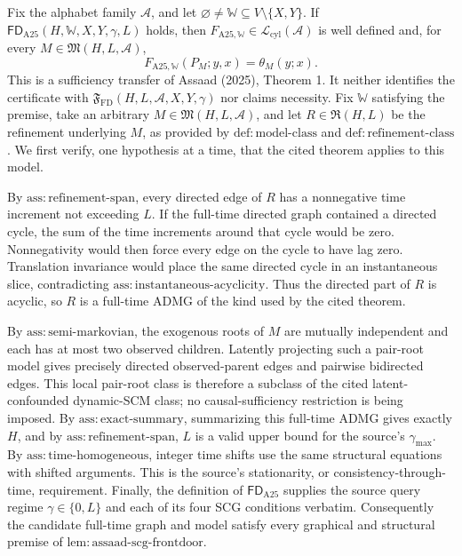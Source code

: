 Fix the alphabet family \(\mathcal A\), and let \(\varnothing\ne\mathbb W\subseteq V\setminus\{X,Y\}\).  If \(\mathsf{FD}_{\mathrm{A25}}(H,\mathbb W,X,Y,\gamma,L)\) holds, then \(F_{\mathrm{A25},\mathbb W}\in\mathcal L_{\mathrm{cyl}}(\mathcal A)\) is well defined and, for every \(M\in\mathfrak M(H,L,\mathcal A)\),
\[
 F_{\mathrm{A25},\mathbb W}(P_M;y,x)=\theta_M(y;x).
\]
This is a sufficiency transfer of Assaad (2025), Theorem 1.  It neither identifies the certificate with \(\mathfrak F_{\mathrm{FD}}(H,L,\mathcal A,X,Y,\gamma)\) nor claims necessity.
Fix \(\mathbb W\) satisfying the premise, take an arbitrary \(M\in\mathfrak M(H,L,\mathcal A)\), and let \(R\in\mathfrak R(H,L)\) be the refinement underlying \(M\), as provided by \(\mathrm{def:model\text{-}class}\) and \(\mathrm{def:refinement\text{-}class}\).  We first verify, one hypothesis at a time, that the cited theorem applies to this model.

By \(\mathrm{ass:refinement\text{-}span}\), every directed edge of \(R\) has a nonnegative time increment not exceeding \(L\).  If the full-time directed graph contained a directed cycle, the sum of the time increments around that cycle would be zero.  Nonnegativity would then force every edge on the cycle to have lag zero.  Translation invariance would place the same directed cycle in an instantaneous slice, contradicting \(\mathrm{ass:instantaneous\text{-}acyclicity}\).  Thus the directed part of \(R\) is acyclic, so \(R\) is a full-time ADMG of the kind used by the cited theorem.

By \(\mathrm{ass:semi\text{-}markovian}\), the exogenous roots of \(M\) are mutually independent and each has at most two observed children.  Latently projecting such a pair-root model gives precisely directed observed-parent edges and pairwise bidirected edges.  This local pair-root class is therefore a subclass of the cited latent-confounded dynamic-SCM class; no causal-sufficiency restriction is being imposed.  By \(\mathrm{ass:exact\text{-}summary}\), summarizing this full-time ADMG gives exactly \(H\), and by \(\mathrm{ass:refinement\text{-}span}\), \(L\) is a valid upper bound for the source's \(\gamma_{\max}\).  By \(\mathrm{ass:time\text{-}homogeneous}\), integer time shifts use the same structural equations with shifted arguments.  This is the source's stationarity, or consistency-through-time, requirement.  Finally, the definition of \(\mathsf{FD}_{\mathrm{A25}}\) supplies the source query regime \(\gamma\in\{0,L\}\) and each of its four SCG conditions verbatim.  Consequently the candidate full-time graph and model satisfy every graphical and structural premise of \(\mathrm{lem:assaad\text{-}scg\text{-}frontdoor}\).

